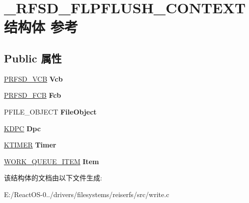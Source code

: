 \hypertarget{struct___r_f_s_d___f_l_p_f_l_u_s_h___c_o_n_t_e_x_t}{}\section{\+\_\+\+R\+F\+S\+D\+\_\+\+F\+L\+P\+F\+L\+U\+S\+H\+\_\+\+C\+O\+N\+T\+E\+X\+T结构体 参考}
\label{struct___r_f_s_d___f_l_p_f_l_u_s_h___c_o_n_t_e_x_t}
\subsection*{Public 属性}
\begin{DoxyCompactItemize}
\item 
\mbox{\label{struct___r_f_s_d___f_l_p_f_l_u_s_h___c_o_n_t_e_x_t_a91a1227a06399f1297b88cc67ad13c47}} 
\hyperlink{struct___r_f_s_d___v_c_b}{P\+R\+F\+S\+D\+\_\+\+V\+CB} {\bfseries Vcb}
\item 
\mbox{\label{struct___r_f_s_d___f_l_p_f_l_u_s_h___c_o_n_t_e_x_t_a55381931898ea7076d4d71c1696c0b36}} 
\hyperlink{struct___r_f_s_d___f_c_b}{P\+R\+F\+S\+D\+\_\+\+F\+CB} {\bfseries Fcb}
\item 
\mbox{\label{struct___r_f_s_d___f_l_p_f_l_u_s_h___c_o_n_t_e_x_t_a9a6e10b82f73479ff0e9f703d7353c5d}} 
P\+F\+I\+L\+E\+\_\+\+O\+B\+J\+E\+CT {\bfseries File\+Object}
\item 
\mbox{\label{struct___r_f_s_d___f_l_p_f_l_u_s_h___c_o_n_t_e_x_t_a2301526ced4c8974704df1291ef4eb69}} 
\hyperlink{struct___k_d_p_c}{K\+D\+PC} {\bfseries Dpc}
\item 
\mbox{\label{struct___r_f_s_d___f_l_p_f_l_u_s_h___c_o_n_t_e_x_t_adf38767d9f94dd408383fabd1aac4a58}} 
\hyperlink{struct___k_t_i_m_e_r}{K\+T\+I\+M\+ER} {\bfseries Timer}
\item 
\mbox{\label{struct___r_f_s_d___f_l_p_f_l_u_s_h___c_o_n_t_e_x_t_a5001365ddb8ecd8d54b79d25c15d2b38}} 
\hyperlink{struct___w_o_r_k___q_u_e_u_e___i_t_e_m}{W\+O\+R\+K\+\_\+\+Q\+U\+E\+U\+E\+\_\+\+I\+T\+EM} {\bfseries Item}
\end{DoxyCompactItemize}


该结构体的文档由以下文件生成\+:\begin{DoxyCompactItemize}
\item 
E\+:/\+React\+O\+S-\/0../drivers/filesystems/reiserfs/src/write.\+c\end{DoxyCompactItemize}

